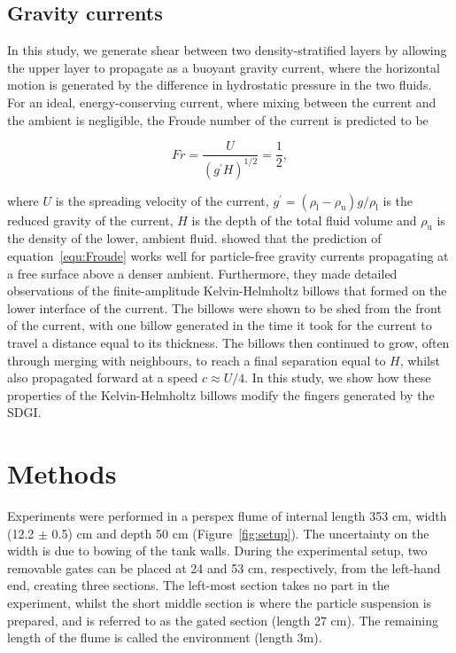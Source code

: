 \documentclass[authoryear,preprint,review,12pt]{elsarticle}
\begin{document}
\subsection{Gravity currents}
\label{subsec:grav_curr}

In this study, we generate shear between two density-stratified layers by allowing the upper layer to propagate as a buoyant gravity current, where the horizontal motion is generated by the difference in hydrostatic pressure in the two fluids. For an ideal, energy-conserving current, where mixing between the current and the ambient is negligible, the Froude number of the current is predicted to be \citep{Benjamin68}

\begin{equation}
  \label{equ:Froude}
  Fr = \frac{U}{(g^{\prime} H)^{1/2}} = \frac{1}{2},
\end{equation}

where $U$ is the spreading velocity of the current, $g^{\prime} = (\rho_{\text{l}} - \rho_{\text{u}}) g/ \rho_{\text{l}}$ is the reduced gravity of the current, $H$ is the depth of the total fluid volume and $\rho_{\text{u}}$ is the density of the lower, ambient fluid. \citet{Jarvis21} showed that the prediction of equation~\ref{equ:Froude} works well for particle-free gravity currents propagating at a free surface above a denser ambient. Furthermore, they made detailed observations of the finite-amplitude Kelvin-Helmholtz billows that formed on the lower interface of the current. The billows were shown to be shed from the front of the current, with one billow generated in the time it took for the current to travel a distance equal to its thickness. The billows then continued to grow, often through merging with neighbours, to reach a final separation equal to $H$, whilst also propagated forward at a speed $c \approx U / 4$. In this study, we show how these properties of the Kelvin-Helmholtz billows modify the fingers generated by the SDGI. 


\section{Methods}
\label{sec:method}

Experiments were performed in a perspex flume of internal length 353 cm, width (12.2 $\pm$ 0.5) cm and depth 50 cm (Figure~\ref{fig:setup}). The uncertainty on the width is due to bowing of the tank walls. During the experimental setup, two removable gates can be placed at 24 and 53 cm, respectively, from the left-hand end, creating three sections. The left-most section takes no part in the experiment, whilst the short middle section is where the particle suspension is prepared, and is referred to as the gated section (length 27 cm). The remaining length of the flume is called the environment (length 3m).
\end{document}
